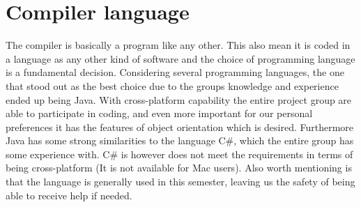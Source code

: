 \section{Compiler language}
The compiler is basically a program like any other. This also mean it is coded in a language as any other kind of software and the choice of programming language is a fundamental decision. Considering several programming languages, the one that stood out as the best choice due to the groups knowledge and experience ended up being Java. With cross-platform capability\cite{java:requirements} the entire project group are able to participate in coding, and even more important for our personal preferences it has the features of object orientation\cite{java:object:orientation} which is desired. Furthermore Java has some strong similarities to the language C\#\cite{java:comparison}, which the entire group has some experience with. C\# is however does not meet the requirements in terms of being cross-platform (It is not available for Mac users). Also worth mentioning is that the language is generally used in this semester, leaving us the safety of being able to receive help if needed.